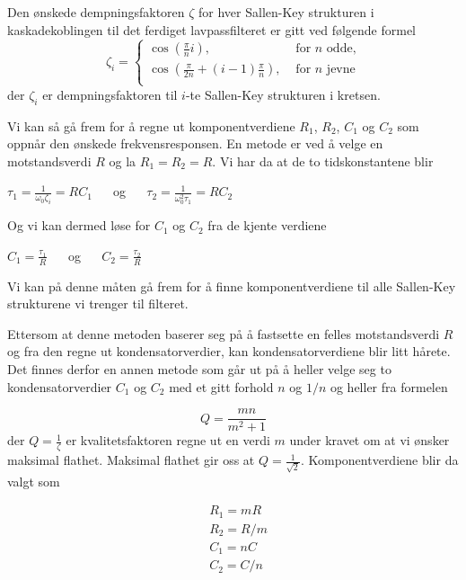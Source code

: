 Den ønskede dempningsfaktoren $\zeta$ for hver Sallen-Key strukturen i kaskadekoblingen til det ferdiget 
lavpassfilteret er gitt ved følgende formel
\begin{equation}
    \zeta_i = \begin{cases}
        \cos\left(\frac{\pi}{n}i\right), & \text{ for $n$ odde,} \\
        \cos\left(\frac{\pi}{2n} + (i - 1)\frac{\pi}{n}\right), & \text{ for $n$ jevne} \\
    \end{cases}
\end{equation}
der $\zeta_i$ er dempningsfaktoren til $i$-te Sallen-Key strukturen i kretsen.

Vi kan så gå frem for å regne ut komponentverdiene $R_1$, $R_2$, $C_1$ og $C_2$ som oppnår den ønskede frekvensresponsen.
En metode er ved å velge en motstandsverdi $R$ og la $R_1 = R_2 = R$. Vi har da at de to tidskonstantene blir
\begin{center}
    $\tau_1 = \frac{1}{\omega_0 \zeta_i} = R C_1\:\:\:\:\:\:$ og $\:\:\:\:\:\: \tau_2 = \frac{1}{\omega_0^2\tau_1} = R C_2$
\end{center}

Og vi kan dermed løse for $C_1$ og $C_2$ fra de kjente verdiene
\begin{center}
    $C_1 = \frac{\tau_1}{R}\:\:\:\:\:\:$ og $\:\:\:\:\:\: C_2 = \frac{\tau_2}{R}$
\end{center}
Vi kan på denne måten gå frem for å finne komponentverdiene til alle Sallen-Key strukturene vi trenger til filteret.

Ettersom at denne metoden baserer seg på å fastsette en felles motstandsverdi $R$ og fra den regne ut kondensatorverdier,
kan kondensatorverdiene blir litt hårete. Det finnes derfor en annen metode \cite{sallen-key-lowpass-wikipedia} som går ut på 
å heller velge seg to kondensatorverdier $C_1$ og $C_2$ med et gitt forhold $n$ og $1/n$ og heller fra formelen

\[
    Q = \frac{mn}{m^2 + 1}
\]
der $Q = \frac{1}{\zeta}$ er kvalitetsfaktoren regne ut en verdi $m$ under kravet om at vi ønsker maksimal flathet.
Maksimal flathet gir oss at $Q = \frac{1}{\sqrt{2}}$. Komponentverdiene blir da valgt som

\begin{align*}
    &R_1 = mR \\
    &R_2 = R/m \\
    &C_1 = nC   \\
    &C_2 = C/n
\end{align*}


